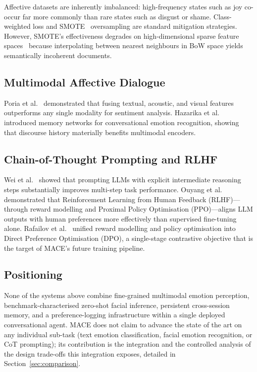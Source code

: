\documentclass[conference]{IEEEtran}
\begin{document}
Affective datasets are inherently imbalanced: high-frequency
states such as joy co-occur far more commonly than rare states
such as disgust or shame.
Class-weighted loss and SMOTE~\cite{chawla2002smote} oversampling
are standard mitigation strategies.
However, SMOTE's effectiveness degrades on high-dimensional sparse
feature spaces~\cite{blagus2013smote} because interpolating
between nearest neighbours in BoW space yields semantically
incoherent documents.

\subsection{Multimodal Affective Dialogue}

Poria et al.~\cite{poria2016convolutional} demonstrated that
fusing textual, acoustic, and visual features outperforms any
single modality for sentiment analysis.
Hazarika et al.~\cite{hazarika2018conversational} introduced
memory networks for conversational emotion recognition, showing
that discourse history materially benefits multimodal encoders.

\subsection{Chain-of-Thought Prompting and RLHF}

Wei et al.~\cite{wei2022chainofthought} showed that prompting
LLMs with explicit intermediate reasoning steps substantially
improves multi-step task performance.
Ouyang et al.~\cite{ouyang2022rlhf} demonstrated that
Reinforcement Learning from Human Feedback (RLHF)---through
reward modelling and Proximal Policy Optimisation (PPO)---aligns
LLM outputs with human preferences more effectively than
supervised fine-tuning alone.
Rafailov et al.~\cite{rafailov2023dpo} unified reward modelling
and policy optimisation into Direct Preference Optimisation (DPO),
a single-stage contrastive objective that is the target of
MACE's future training pipeline.

\subsection{Positioning}

None of the systems above combine fine-grained multimodal emotion
perception, benchmark-characterised zero-shot facial inference,
persistent cross-session memory, and a preference-logging
infrastructure within a single deployed conversational agent.
MACE does not claim to advance the state of the art on any
individual sub-task (text emotion classification, facial emotion
recognition, or CoT prompting); its contribution is the
integration and the controlled analysis of the design trade-offs
this integration exposes, detailed in Section~\ref{sec:comparison}.
\end{document}

